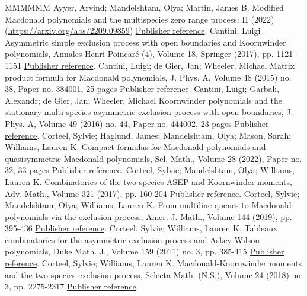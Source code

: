 \begin{thebibliography}{MMMMMM}
 Ayyer, Arvind; Mandelshtam, Olya; Martin, James B. Modified Macdonald polynomials and the multispecies zero range process: II (2022) (\url{https://arxiv.org/abs/2209.09859}) \href{https://alco.centre-mersenne.org/articles/10.5802/alco.248/#AMM22}{Publisher reference}.
 Cantini, Luigi Asymmetric simple exclusion process with open boundaries and Koornwinder polynomials, Annales Henri Poincaré (4), Volume 18, Springer (2017), pp. 1121-1151 \href{https://alco.centre-mersenne.org/articles/10.5802/alco.248/#cantini-2017}{Publisher reference}.
 Cantini, Luigi; de Gier, Jan; Wheeler, Michael Matrix product formula for Macdonald polynomials, J. Phys. A, Volume 48 (2015) no. 38, Paper no. 384001, 25 pages \href{https://alco.centre-mersenne.org/articles/10.5802/alco.248/#CGW-2015}{Publisher reference}.
 Cantini, Luigi; Garbali, Alexandr; de Gier, Jan; Wheeler, Michael Koornwinder polynomials and the stationary multi-species asymmetric exclusion process with open boundaries, J. Phys. A, Volume 49 (2016) no. 44, Paper no. 444002, 23 pages \href{https://alco.centre-mersenne.org/articles/10.5802/alco.248/#cantini-etal-2016}{Publisher reference}.
 Corteel, Sylvie; Haglund, James; Mandelshtam, Olya; Mason, Sarah; Williams, Lauren K. Compact formulas for Macdonald polynomials and quasisymmetric Macdonald polynomials, Sel. Math., Volume 28 (2022), Paper no. 32, 33 pages \href{https://alco.centre-mersenne.org/articles/10.5802/alco.248/#compactformula}{Publisher reference}.
 Corteel, Sylvie; Mandelshtam, Olya; Williams, Lauren K. Combinatorics of the two-species ASEP and Koornwinder moments, Adv. Math., Volume 321 (2017), pp. 160-204 \href{https://alco.centre-mersenne.org/articles/10.5802/alco.248/#CMW-2017}{Publisher reference}.
 Corteel, Sylvie; Mandelshtam, Olya; Williams, Lauren K. From multiline queues to Macdonald polynomials via the exclusion process, Amer. J. Math., Volume 144 (2019), pp. 395-436 \href{https://alco.centre-mersenne.org/articles/10.5802/alco.248/#CMW18}{Publisher reference}.
 Corteel, Sylvie; Williams, Lauren K. Tableaux combinatorics for the asymmetric exclusion process and Askey-Wilson polynomials, Duke Math. J., Volume 159 (2011) no. 3, pp. 385-415 \href{https://alco.centre-mersenne.org/articles/10.5802/alco.248/#CW11}{Publisher reference}.
 Corteel, Sylvie; Williams, Lauren K. Macdonald-Koornwinder moments and the two-species exclusion process, Selecta Math. (N.S.), Volume 24 (2018) no. 3, pp. 2275-2317 \href{https://alco.centre-mersenne.org/articles/10.5802/alco.248/#CW18}{Publisher reference}.

\end{thebibliography}
